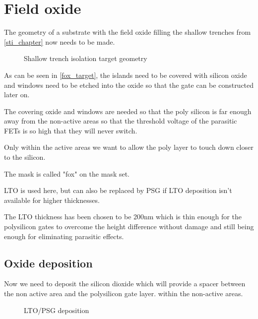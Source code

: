 \section{Field oxide}\label{fox_chapter}

The geometry of a substrate with the field oxide filling the shallow trenches from \autoref{sti_chapter} now needs to be made.

\begin{figure}[H]
	\centering
	\begin{tikzpicture}[node distance = 3cm, auto, thick,scale=\CrossAndTopSectionBig, every node/.style={transform shape}]
		
	\end{tikzpicture}
	\caption{Shallow trench isolation target geometry}
	\label{fox_target}
\end{figure}

As can be seen in \autoref{fox_target}, the islands need to be covered with silicon oxide and windows need to be etched into the oxide so that the gate can be constructed later on.

The covering oxide and windows are needed so that the poly silicon is far enough away from the non-active areas so that the threshold voltage of the parasitic FETs is so high that they will never switch.

Only within the active areas we want to allow the poly layer to touch down closer to the silicon.

The mask is called "fox" on the mask set.

LTO is used here, but can also be replaced by PSG if LTO deposition isn't available for higher thicknesses.

The LTO thickness has been chosen to be 200nm which is thin enough for the polysilicon gates to overcome the height difference without damage and still being enough for eliminating parasitic effects.

\newpage

\subsection{Oxide deposition}

Now we need to deposit the silicon dioxide which will provide a spacer between the non active area and the polysilicon gate layer. within the non-active areas.

\begin{figure}[H]
	\centering
	\begin{tikzpicture}[node distance = 3cm, auto, thick,scale=\CrossSectionOnly, every node/.style={transform shape}]
		
	\end{tikzpicture}
	\drawStepArrow{}
	\begin{tikzpicture}[node distance = 3cm, auto, thick,scale=\CrossSectionOnly, every node/.style={transform shape}]
		
	\end{tikzpicture}
	\caption{LTO/PSG deposition}
\end{figure}

